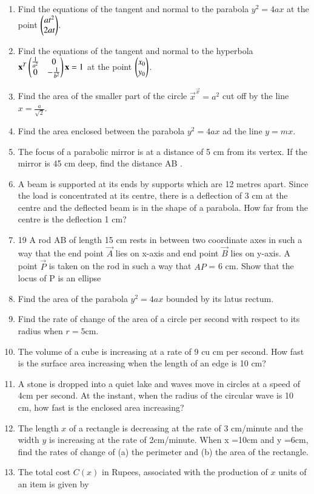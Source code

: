 \begin{enumerate}[label=\arabic*.,ref=\thesubsection.\theenumi]
\item Find the equations of the tangent and normal to the parabola 
$y^2 = 4ax$ at the point $\begin{pmatrix}at^2\\2at\end{pmatrix}$.
\item Find the equations of the tangent and normal to the hyperbola 
$
\mathbf{x}^T\begin{pmatrix}\frac{1}{a^2} & 0 \\ 0 & -\frac{1}{b^2}\end{pmatrix}\mathbf{x} = 1
$
at the point $\begin{pmatrix}x_0\\ y_0 \end{pmatrix}$.
\item  Find the area of the smaller part of the circle $\vec{x}^\vec{x}=a^2$ cut off by the line $x = \frac{a}{\sqrt{2}}$.
\item Find the area enclosed between the parabola $y^2=4ax$ ad the line $y = mx$.
\item The focus of a parabolic mirror is at a distance of 5 cm from its vertex. If the mirror is 45 cm deep, find the distance AB .
\item A beam is supported at its ends by  supports which are 12 metres apart. Since the load is concentrated at its centre, there is a deflection of 3 cm at the centre and the deflected beam is in the shape of a parabola. How far from the centre is the deflection 1 cm?
\item 19 A rod AB of length 15 cm rests in between two coordinate axes in such a way that the end point $\vec{A}$ lies on x-axis and end point $\vec{B}$ lies on y-axis. A point $\vec{P}$ is taken on the rod in such a way that $AP$ = 6 cm. Show that the locus of P is an ellipse
%
\item Find the area of the parabola $y^2 = 4ax$ bounded by its latus rectum.
\item Find the rate of change of the area of a circle per second with respect to its radius when $r = 5$cm.
\item The volume of a cube is increasing at a rate of 9 cu cm per second.  How fast is the surface area increasing when the length of an edge is 10 cm?
\item A stone is dropped into a quiet lake and waves move in circles at a speed of 4cm per second. At the instant, when the radius of the circular wave is 10 cm, how fast is the enclosed area increasing?
\item The length $x$ of a rectangle is decreasing at the rate of 3 cm/minute and the width $y$ is increasing at the rate of 2cm/minute. When x =10cm and y =6cm, find the rates of change of (a) the perimeter and (b) the area of the rectangle.
\item The total cost $C(x)$ in Rupees, associated with the production of $x$ units of an item is given by

\end{enumerate}
